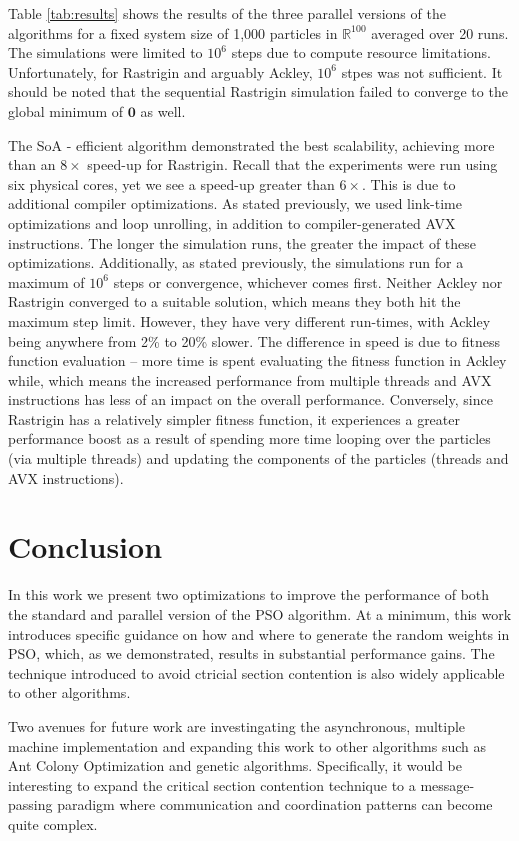 Table \ref{tab:results} shows the results of the three parallel versions of the
algorithms for a fixed system size of 1,000 particles in $\mathbb{R}^{100}$
averaged over 20 runs. The simulations were limited to $10^6$ steps due to
compute resource limitations. 
Unfortunately, for Rastrigin and arguably Ackley, $10^6$ stpes was not sufficient.
It should be noted that the sequential Rastrigin
simulation failed to converge to the global minimum of $\mathbf{0}$ as well.

The SoA - efficient algorithm demonstrated the best scalability, achieving more
than an $8\times$ speed-up for Rastrigin. Recall that the experiments were run
using six physical cores, yet we see a speed-up greater than $6\times$. This is
due to additional compiler optimizations. As stated previously, we used
link-time optimizations and loop unrolling, in addition to compiler-generated
AVX instructions. The longer the simulation runs, the greater the impact of
these optimizations. Additionally, as stated previously, the simulations run for
a maximum of $10^6$ steps or convergence, whichever comes first. Neither Ackley
nor Rastrigin converged to a suitable solution, which means they both hit the
maximum step limit. However, they have very different run-times, with Ackley
being anywhere from 2\% to 20\% slower. The difference in speed is due to
fitness function evaluation -- more time is spent evaluating the fitness
function in Ackley while, which means the increased performance from multiple
threads and AVX instructions has less of an impact on the overall
performance. Conversely, since Rastrigin has a relatively simpler fitness
function, it experiences a greater performance boost as a result of spending
more time looping over the particles (via multiple threads) and updating the
components of the particles (threads and AVX instructions).

\section{Conclusion}
In this work we present two optimizations to improve the performance of both the
standard and parallel version of the PSO algorithm. At a minimum, this work
introduces specific guidance on how and where to generate the random weights in
PSO, which, as we demonstrated, results in substantial performance gains. The
technique introduced to avoid ctricial section contention is also widely
applicable to other algorithms.

Two avenues for future work are investingating the asynchronous, multiple
machine implementation and expanding this work to other algorithms such as Ant
Colony Optimization and genetic algorithms. Specifically, it would be
interesting to expand the critical section contention technique to a
message-passing paradigm where communication and coordination patterns can
become quite complex.


